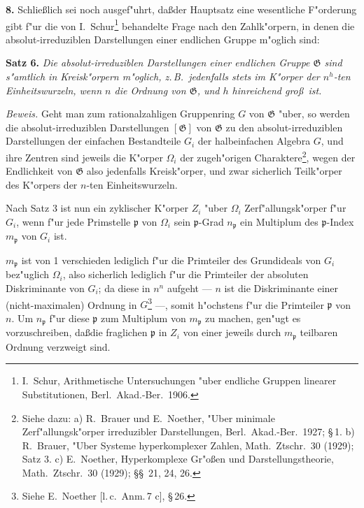 \documentclass[12pt,a4paper]{article}
\theoremstyle{plain}
\begin{document}
\medskip\noindent\textbf{8.}
Schlie\ss lich sei noch ausgef"uhrt, da\ss der Hauptsatz eine wesentliche F"orderung gibt f"ur die von I.\ Schur\footnote{I.\ Schur, Arithmetische Untersuchungen "uber endliche Gruppen linearer Substitutionen, Berl.\ Akad.-Ber.\ 1906.} behandelte Frage nach den Zahlk"orpern, in denen die absolut-irreduziblen Darstellungen einer endlichen Gruppe m"oglich sind:

\medskip\noindent\textbf{Satz 6.}
\textit{Die absolut-irreduziblen Darstellungen einer endlichen Gruppe $\mathfrak{G}$ sind s"amtlich in Kreisk"orpern m"oglich, z.\,B.\ jedenfalls stets im K"orper der $n^h$-ten Einheitswurzeln, wenn $n$ die Ordnung von $\mathfrak{G}$, und $h$ hinreichend gro\ss\ ist.}

\noindent\textit{Beweis.}
Geht man zum rationalzahligen Gruppenring $G$ von $\mathfrak{G}$ "uber, so werden die absolut-irreduziblen Darstellungen $[\mathfrak{G}]$ von $\mathfrak{G}$ zu den absolut-irreduziblen Darstellungen der einfachen Bestandteile $G_i$ der halbeinfachen Algebra $G$, und ihre Zentren sind jeweils die K"orper $\Omega_i$ der zugeh"origen Charaktere\footnote{Siehe dazu: a) R.\ Brauer und E.\ Noether, "Uber minimale Zerf"allungsk"orper irreduzibler Darstellungen, Berl.\ Akad.-Ber.\ 1927; \S\,1. b) R.\ Brauer, "Uber Systeme hyperkomplexer Zahlen, Math.\ Ztschr.\ 30 (1929); Satz 3. c) E.\ Noether, Hyperkomplexe Gr"o\ss en und Darstellungstheorie, Math.\ Ztschr.\ 30 (1929); \S\S\ 21, 24, 26.}, wegen der Endlichkeit von $\mathfrak{G}$ also jedenfalls Kreisk"orper, und zwar sicherlich Teilk"orper des K"orpers der $n$-ten Einheitswurzeln.

Nach Satz 3 ist nun ein zyklischer K"orper $Z_i$ "uber $\Omega_i$ Zerf"allungsk"orper f"ur $G_i$, wenn f"ur jede Primstelle $\mathfrak{p}$ von $\Omega_i$ sein $\mathfrak{p}$-Grad $n_\mathfrak{p}$ ein Multiplum des $\mathfrak{p}$-Index $m_\mathfrak{p}$ von $G_i$ ist.

$m_\mathfrak{p}$ ist von 1 verschieden lediglich f"ur die Primteiler des Grundideals von $G_i$ bez"uglich $\Omega_i$, also sicherlich lediglich f"ur die Primteiler der absoluten Diskriminante von $G_i$; da diese in $n^n$ aufgeht --- $n$ ist die Diskriminante einer (nicht-maximalen) Ordnung in $G$\footnote{Siehe E.\ Noether [l.\,c.\ Anm.\,7 c], \S\,26.} ---, somit h"ochstens f"ur die Primteiler $\mathfrak{p}$ von $n$. Um $n_\mathfrak{p}$ f"ur diese $\mathfrak{p}$ zum Multiplum von $m_\mathfrak{p}$ zu machen, gen"ugt es vorzuschreiben, da\ss die fraglichen $\mathfrak{p}$ in $Z_i$ von einer jeweils durch $m_\mathfrak{p}$ teilbaren Ordnung verzweigt sind.
\end{document}
